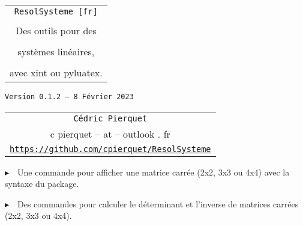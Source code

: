 \documentclass[a4paper,11pt]{article}
\def\TPversion{0.1.2}
\def\TPdate{8 Février 2023}
\begin{document}
\setlength{\aweboxleftmargin}{0.07\linewidth}
\setlength{\aweboxcontentwidth}{0.93\linewidth}
\setlength{\aweboxvskip}{8pt}

\pagestyle{fancy}

\thispagestyle{empty}

\vspace{2cm}

\begin{center}
	\begin{minipage}{0.75\linewidth}
	\begin{tcolorbox}[colframe=yellow,colback=yellow!15]
		\begin{center}
			\begin{tabular}{c}
				{\Huge \texttt{ResolSysteme [fr]}}\\
				\\
				{\LARGE Des outils pour des} \\
				\\
				{\LARGE systèmes linéaires,} \\
				\\
				{\LARGE avec xint ou pyluatex.} \\
			\end{tabular}
			
			\bigskip
			
			{\small \texttt{Version \TPversion{} -- \TPdate}}
		\end{center}
	\end{tcolorbox}
\end{minipage}
\end{center}

\vspace{0.5cm}

\begin{center}
	\begin{tabular}{c}
	\texttt{Cédric Pierquet}\\
	{\ttfamily c pierquet -- at -- outlook . fr}\\
	\texttt{\url{https://github.com/cpierquet/ResolSysteme}}
\end{tabular}
\end{center}

\vspace{0.25cm}

{$\blacktriangleright$~~Une commande pour afficher une matrice carrée (2x2, 3x3 ou 4x4) avec la syntaxe du package.}

\smallskip

{$\blacktriangleright$~~Des commandes pour calculer le déterminant et l'inverse de matrices carrées (2x2, 3x3 ou 4x4).}
\end{document}
